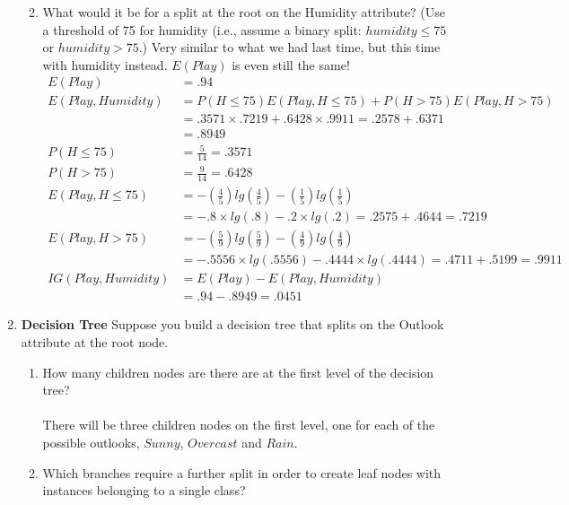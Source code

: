 \documentclass[12pt]{article}
\begin{document}
\begin{enumerate}
\begin{enumerate}
\newpage
\item What would it be for a split at the root on the Humidity attribute? (Use a threshold of 75 for humidity (i.e., assume a binary split: $humidity \leq 75$ or $humidity > 75$.)
Very similar to what we had last time, but this time with humidity instead. $E(Play)$ is even still the same!\\
\begin{align*}
E(Play) &= .94\\
E(Play, Humidity) &= P(H \leq 75)E(Play, H \leq 75) + P(H > 75)E(Play, H > 75)\\
&= .3571 \times .7219 + .6428 \times .9911 = .2578 + .6371\\
&= .8949\\
P(H \leq 75) &= \frac{5}{14} = .3571\\
P(H > 75) &= \frac{9}{14} = .6428\\
E(Play, H \leq 75) &= - (\frac{4}{5})lg(\frac{4}{5}) - (\frac{1}{5})lg(\frac{1}{5})\\
&= - .8 \times lg(.8) - .2 \times lg(.2)
= .2575 + .4644 = .7219\\
E(Play, H > 75) &= - (\frac{5}{9})lg(\frac{5}{9}) - (\frac{4}{9})lg(\frac{4}{9})\\
&= - .5556 \times lg(.5556) - .4444 \times lg(.4444)
= .4711 + .5199 = .9911\\
IG(Play, Humidity) &= E(Play) - E(Play, Humidity)\\
&= .94 - .8949 = \boxed{.0451}
\end{align*}

\end{enumerate}
\newpage

\item \textbf{Decision Tree} Suppose you build a decision tree that splits on the Outlook attribute at the root node.\\
\begin{enumerate}
\item How many children nodes are there are at the first level of the decision tree?\\
\vspace{-2em}
\paragraph{} There will be three children nodes on the first level, one for each of the possible outlooks, $Sunny$, $Overcast$ and $Rain$.\\
\item Which branches require a further split in order to create leaf nodes with instances belonging to a single class?\\
\vspace{-2em}

\end{enumerate}
\end{enumerate}
\end{document}
